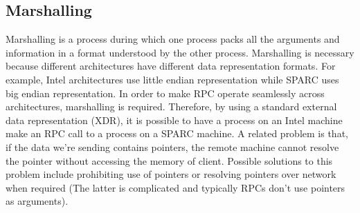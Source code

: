 \documentclass[twoside]{article}
\begin{document}
\subsection{Marshalling}
Marshalling is a process during which one process packs all the arguments and information in a format understood by the other process. Marshalling is necessary because different architectures have different data representation formats. For example, Intel architectures use little endian representation while SPARC uses big endian representation. In order to make RPC operate seamlessly across architectures, marshalling is required. Therefore, by using a standard external data representation (XDR), it is possible to have a process on an Intel machine make an RPC call to a process on a SPARC machine. A related problem is that, if the data we're sending contains pointers, the remote machine cannot resolve the pointer without accessing the memory of client. Possible solutions to this problem include prohibiting use of pointers or resolving pointers over network when required (The latter is complicated and typically RPCs don't use pointers as arguments). 
\end{document}
